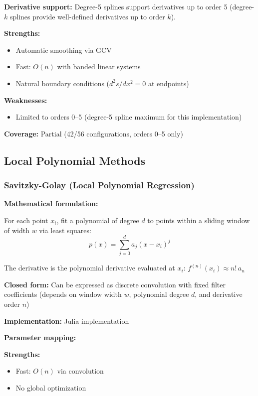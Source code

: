 \textbf{Derivative support:} Degree-5 splines support derivatives up to order 5 (degree-$k$ splines provide well-defined derivatives up to order $k$).

\textbf{Strengths:}
\begin{itemize}
    \item Automatic smoothing via GCV
    \item Fast: $O(n)$ with banded linear systems
    \item Natural boundary conditions ($d^2s/dx^2 = 0$ at endpoints)
\end{itemize}

\textbf{Weaknesses:}
\begin{itemize}
    \item Limited to orders 0--5 (degree-5 spline maximum for this implementation)
\end{itemize}

\textbf{Coverage:} Partial (42/56 configurations, orders 0--5 only)

\subsection{Local Polynomial Methods}
\label{sec:local_poly}

\subsubsection{Savitzky-Golay (Local Polynomial Regression)}

\textbf{Mathematical formulation:}

For each point $x_i$, fit a polynomial of degree $d$ to points within a sliding window of width $w$ via least squares:
\begin{equation}
p(x) = \sum_{j=0}^d a_j (x - x_i)^j
\end{equation}

The derivative is the polynomial derivative evaluated at $x_i$: $f^{(n)}(x_i) \approx n! \, a_n$

\textbf{Closed form:} Can be expressed as discrete convolution with fixed filter coefficients (depends on window width $w$, polynomial degree $d$, and derivative order $n$)

\textbf{Implementation:} Julia implementation

\textbf{Parameter mapping:} 

\textbf{Strengths:}
\begin{itemize}
    \item Fast: $O(n)$ via convolution
    \item No global optimization
\end{itemize}


